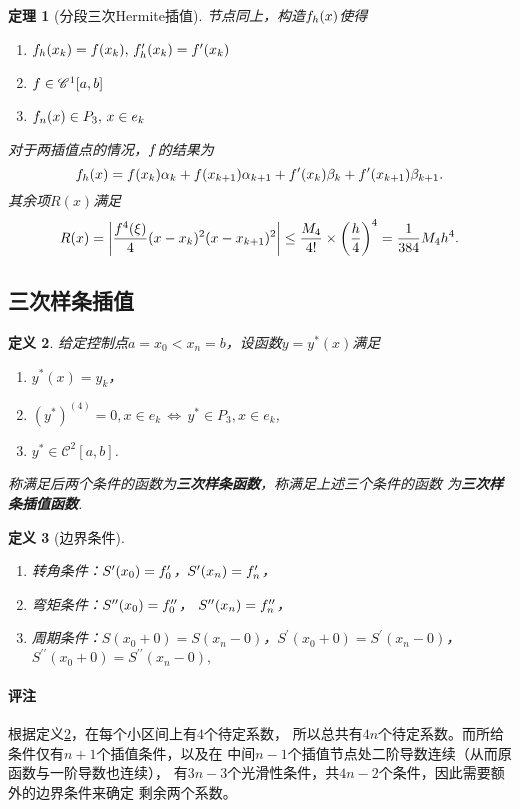 \documentclass[12pt, a4paper]{article}
\theoremstyle{margin}
\newtheorem{thm}{定理}
\newtheorem{defi}[thm]{定义}
\newcommand{\hp}{^\prime}
\newcommand{\ms}{\mathscr}
\newcommand{\tbf}{\textbf}
\newcommand{\f}{\mathnormal{f}}
\newcommand\defref[1]{定义\ref{#1}}
\newcommand{\remark}{\paragraph{评注}}
\begin{document}
  \begin{thm}[分段三次Hermite插值]
    节点同上，构造$\f_h(x)$使得
    \begin{enumerate}
      \item $\f_h(x_k) = \f(x_k),\,\f_h\hp(x_k) = \f\hp(x_k)$
      \item $\f\in \ms{C}^1[a, b]$
      \item $\f_n(x) \in P_3,\,x\in e_k$
    \end{enumerate}
    对于两插值点的情况，$\f$的结果为
    \[
      \f_h(x) = \f(x_k)\alpha_k + \f(x_{k+1})\alpha_{k+1}
       + \f\hp(x_k)\beta_k + \f\hp(x_{k+1})\beta_{k+1}.
    \]
    其余项$R(x)$满足
    \[
      R(x) = \left|\frac{\f^{4}(\xi)}{4}(x-x_{k})^2(x-x_{k+1})^2\right|
      \le \frac{M_4}{4!}\times\left(\frac{h}{4}\right)^4
      =\frac{1}{384}M_4h^4.
    \]
  \end{thm}

\subsection{三次样条插值}
  \begin{defi}
    \label{defi: 三次样条插值}
    给定控制点$a = x_0 < x_n = b$，设函数$y=y^*(x)$满足
    \begin{enumerate}
      \item $y^*(x) = y_k$，
      \item $(y^*)^{(4)} = 0,x\in e_k\,\Leftrightarrow
      \,y^* \in P_3,x\in e_k$,
      \item $y^*\in\ms{C}^2[a, b]$.
    \end{enumerate}
    称满足后两个条件的函数为\tbf{三次样条函数}，称满足上述三个条件的函数
    为\tbf{三次样条插值函数}.
  \end{defi}

  \begin{defi}[边界条件]
    $\,$
    \begin{enumerate}
      \item 转角条件：$S\hp(x_0) = \f_0\hp$，$S\hp(x_n) = \f_n\hp$，
      \item 弯矩条件：$S^{\prime\prime}(x_0) = \f_0^{\prime\prime}$，
      $S^{\prime\prime}(x_n) = \f_n^{\prime\prime}$，
      \item 周期条件：$S(x_0+0)=S(x_n-0)$，$S\hp(x_0+0)=S\hp(x_n-0)$，
      $S^{\prime\prime}(x_0+0)=S^{\prime\prime}(x_n-0),$
    \end{enumerate}
  \end{defi}
  \remark
    根据\defref{defi: 三次样条插值}，在每个小区间上有$4$个待定系数，
    所以总共有$4n$个待定系数。而所给条件仅有$n+1$个插值条件，以及在
    中间$n-1$个插值节点处二阶导数连续（从而原函数与一阶导数也连续），
    有$3n-3$个光滑性条件，共$4n-2$个条件，因此需要额外的边界条件来确定
    剩余两个系数。
\end{document}

